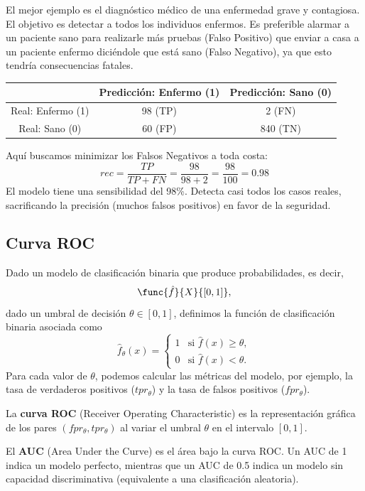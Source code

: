 \documentclass[a4,11pt]{aleph-notas}
\begin{document}
El mejor ejemplo es el diagnóstico médico de una enfermedad grave y contagiosa. El objetivo es detectar a todos los individuos enfermos. Es preferible alarmar a un paciente sano para realizarle más pruebas (Falso Positivo) que enviar a casa a un paciente enfermo diciéndole que está sano (Falso Negativo), ya que esto tendría consecuencias fatales.

\begin{center}\small
\begin{tabular}{c|c|c}
    & Predicción: Enfermo (1) & Predicción: Sano (0) \\
    \hline
    Real: Enfermo (1) & 98 (TP) & {2 (FN)} \\
    \hline
    Real: Sano (0) & 60 (FP) & 840 (TN) \\
\end{tabular}
\end{center}
Aquí buscamos minimizar los Falsos Negativos a toda costa:
\[rec = \frac{TP}{TP + FN} = \frac{98}{98 + 2} = \frac{98}{100} = 0.98\]
El modelo tiene una sensibilidad del 98\%. Detecta casi todos los casos reales, sacrificando la precisión (muchos falsos positivos) en favor de la seguridad.

\subsection{Curva ROC}

Dado un modelo de clasificación binaria que produce probabilidades, es decir,
\[
\func{\hat{f}}{X}{[0,1]},
\]
dado un umbral de decisión $\theta \in [0,1]$, definimos la función de clasificación binaria asociada como
\[
\hat{f}_\theta(x) = \begin{cases}
1 & \text{si } \hat{f}(x) \geq \theta, \\
0 & \text{si } \hat{f}(x) < \theta.
\end{cases}
\]
Para cada valor de $\theta$, podemos calcular las métricas del modelo, por ejemplo, la tasa de verdaderos positivos ($tpr_\theta$) y la tasa de falsos positivos ($fpr_\theta$).

\begin{defi}
    La \textbf{curva ROC} (Receiver Operating Characteristic) es la representación gráfica de los pares $(fpr_\theta, tpr_\theta)$ al variar el umbral $\theta$ en el intervalo $[0,1]$.
\end{defi}

\begin{defi}
    El \textbf{AUC} (Area Under the Curve) es el área bajo la curva ROC. Un AUC de 1 indica un modelo perfecto, mientras que un AUC de 0.5 indica un modelo sin capacidad discriminativa (equivalente a una clasificación aleatoria).
\end{defi}
\end{document}
